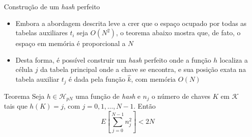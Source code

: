 \begin{frame}[fragile]{Construção de um {\it hash} perfeito}

    \begin{itemize}
        \item Embora a abordagem descrita leve a crer que o espaço ocupado por todas as 
            tabelas auxiliares $t_i$ seja $O(N^2)$, o teorema abaixo mostra que, de fato,
            o espaço em memória é proporcional a $N$

        \item Desta forma, é possível construir um \textit{hash} perfeito onde a função $h$ localiza
            a célula $j$ da tabela principal onde a chave se encontra, e sua posição exata na
            tabela auxiliar $t_j$ é dada pela função $\hat{k}$, com memória $O(N)$

    \end{itemize}

    \begin{block}{Teorema}
        Seja $h \in \mathcal{H}_{pN}$ uma função de \textit{hash} e $n_j$ o número de chaves $K$ em
            $\mathcal{K}$ tais que $h(K) = j$, com $j = 0, 1, \ldots, N - 1$. Então
            \[
                E\left[ \sum_{j = 0}^{N - 1} n_j^2\right] < 2N
            \]
    \end{block}

\end{frame}



